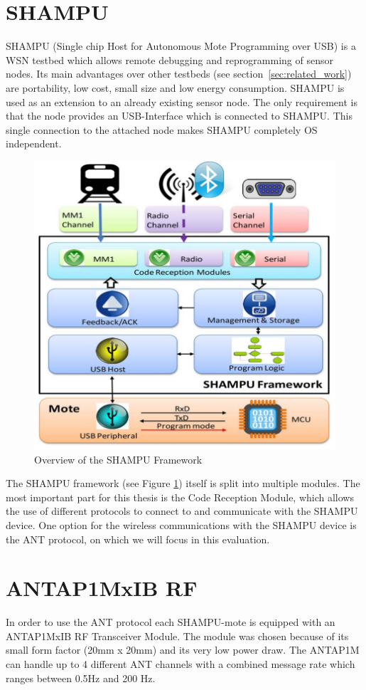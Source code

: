 \section{SHAMPU}
SHAMPU (Single chip Host for Autonomous Mote Programming over USB) \cite{Smeets:2014:DAL:2602339.2602401} is a WSN testbed which allows remote debugging and reprogramming of sensor nodes. Its main advantages over other testbeds (see section~\ref{sec:related_work}) are portability, low cost, small size and low energy consumption. SHAMPU is used as an extension to an already existing sensor node. The only requirement is that the node provides an USB-Interface which is connected to SHAMPU. This single connection to the attached node makes SHAMPU completely OS independent.
\begin{figure}[H]
\centering
\includegraphics[scale=.5]{./pics/SHAMPUframework.png}
\caption{Overview of the SHAMPU Framework \cite{Smeets:2014:DAL:2602339.2602401}}\label{fig:shampuframework}
\end{figure}
The SHAMPU framework (see Figure \ref{fig:shampuframework}) itself is split into multiple modules. The most important part for this thesis is the Code Reception Module, which allows the use of different protocols to connect to and communicate with the SHAMPU device. One option for the wireless communications with the SHAMPU device is the ANT protocol, on which we will focus in this evaluation.

\section{ANTAP1MxIB RF}
In order to use the ANT protocol each SHAMPU-mote is equipped with an ANTAP1MxIB RF Transceiver Module. The module was chosen because of its small form factor (20mm x 20mm) and its very low power draw. The ANTAP1M can handle up to 4 different ANT channels with a combined message rate which ranges between 0.5Hz and 200 Hz. 

